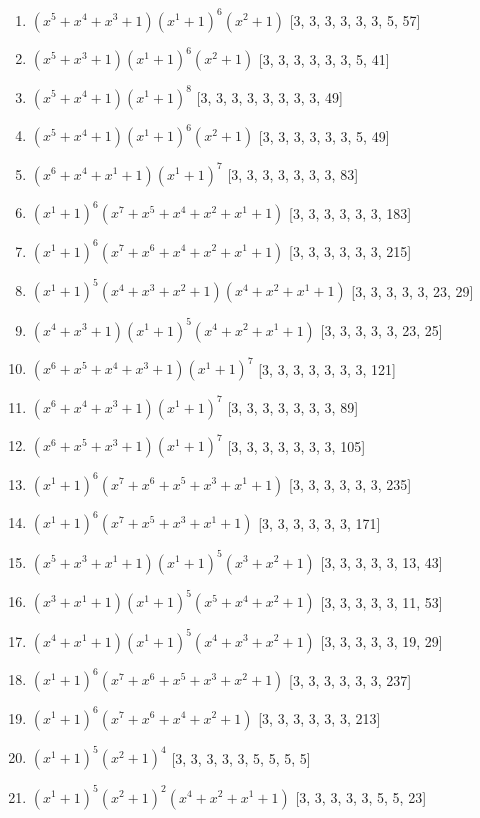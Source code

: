 \documentclass[10pt,twocolumn]{article}
\begin{document}
\begin{enumerate}
\item $(x^{5} + x^{4} + x^{3} + 1)(x^{1} + 1)^{6}(x^{2} + 1)$  [3, 3, 3, 3, 3, 3, 5, 57]
\item $(x^{5} + x^{3} + 1)(x^{1} + 1)^{6}(x^{2} + 1)$  [3, 3, 3, 3, 3, 3, 5, 41]
\item $(x^{5} + x^{4} + 1)(x^{1} + 1)^{8}$  [3, 3, 3, 3, 3, 3, 3, 3, 49]
\item $(x^{5} + x^{4} + 1)(x^{1} + 1)^{6}(x^{2} + 1)$  [3, 3, 3, 3, 3, 3, 5, 49]
\item $(x^{6} + x^{4} + x^{1} + 1)(x^{1} + 1)^{7}$  [3, 3, 3, 3, 3, 3, 3, 83]
\item $(x^{1} + 1)^{6}(x^{7} + x^{5} + x^{4} + x^{2} + x^{1} + 1)$  [3, 3, 3, 3, 3, 3, 183]
\item $(x^{1} + 1)^{6}(x^{7} + x^{6} + x^{4} + x^{2} + x^{1} + 1)$  [3, 3, 3, 3, 3, 3, 215]
\item $(x^{1} + 1)^{5}(x^{4} + x^{3} + x^{2} + 1)(x^{4} + x^{2} + x^{1} + 1)$  [3, 3, 3, 3, 3, 23, 29]
\item $(x^{4} + x^{3} + 1)(x^{1} + 1)^{5}(x^{4} + x^{2} + x^{1} + 1)$  [3, 3, 3, 3, 3, 23, 25]
\item $(x^{6} + x^{5} + x^{4} + x^{3} + 1)(x^{1} + 1)^{7}$  [3, 3, 3, 3, 3, 3, 3, 121]
\item $(x^{6} + x^{4} + x^{3} + 1)(x^{1} + 1)^{7}$  [3, 3, 3, 3, 3, 3, 3, 89]
\item $(x^{6} + x^{5} + x^{3} + 1)(x^{1} + 1)^{7}$  [3, 3, 3, 3, 3, 3, 3, 105]
\item $(x^{1} + 1)^{6}(x^{7} + x^{6} + x^{5} + x^{3} + x^{1} + 1)$  [3, 3, 3, 3, 3, 3, 235]
\item $(x^{1} + 1)^{6}(x^{7} + x^{5} + x^{3} + x^{1} + 1)$  [3, 3, 3, 3, 3, 3, 171]
\item $(x^{5} + x^{3} + x^{1} + 1)(x^{1} + 1)^{5}(x^{3} + x^{2} + 1)$  [3, 3, 3, 3, 3, 13, 43]
\item $(x^{3} + x^{1} + 1)(x^{1} + 1)^{5}(x^{5} + x^{4} + x^{2} + 1)$  [3, 3, 3, 3, 3, 11, 53]
\item $(x^{4} + x^{1} + 1)(x^{1} + 1)^{5}(x^{4} + x^{3} + x^{2} + 1)$  [3, 3, 3, 3, 3, 19, 29]
\item $(x^{1} + 1)^{6}(x^{7} + x^{6} + x^{5} + x^{3} + x^{2} + 1)$  [3, 3, 3, 3, 3, 3, 237]
\item $(x^{1} + 1)^{6}(x^{7} + x^{6} + x^{4} + x^{2} + 1)$  [3, 3, 3, 3, 3, 3, 213]
\item $(x^{1} + 1)^{5}(x^{2} + 1)^{4}$  [3, 3, 3, 3, 3, 5, 5, 5, 5]
\item $(x^{1} + 1)^{5}(x^{2} + 1)^{2}(x^{4} + x^{2} + x^{1} + 1)$  [3, 3, 3, 3, 3, 5, 5, 23]

\end{enumerate}
\end{document}
